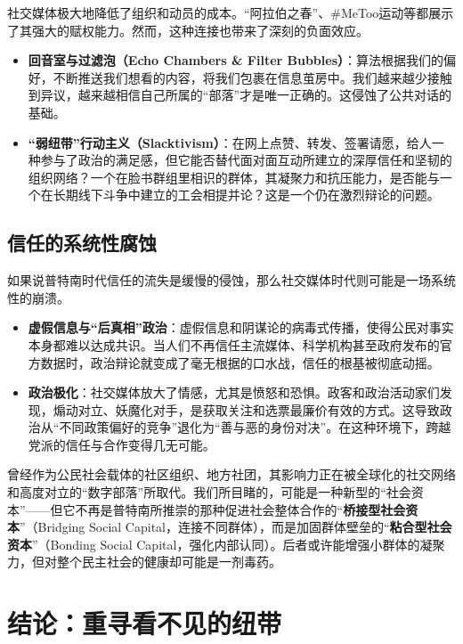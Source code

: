 \documentclass[a5paper, 11pt, openany]{ctexbook}
\begin{document}
社交媒体极大地降低了组织和动员的成本。“阿拉伯之春”、\#MeToo运动等都展示了其强大的赋权能力。然而，这种连接也带来了深刻的负面效应。
\begin{itemize}
    \item \textbf{回音室与过滤泡（Echo Chambers \& Filter Bubbles）}：算法根据我们的偏好，不断推送我们想看的内容，将我们包裹在信息茧房中。我们越来越少接触到异议，越来越相信自己所属的“部落”才是唯一正确的。这侵蚀了公共对话的基础。
    \item \textbf{“弱纽带”行动主义（Slacktivism）}：在网上点赞、转发、签署请愿，给人一种参与了政治的满足感，但它能否替代面对面互动所建立的深厚信任和坚韧的组织网络？一个在脸书群组里相识的群体，其凝聚力和抗压能力，是否能与一个在长期线下斗争中建立的工会相提并论？这是一个仍在激烈辩论的问题。
\end{itemize}

\subsection{信任的系统性腐蚀}

如果说普特南时代信任的流失是缓慢的侵蚀，那么社交媒体时代则可能是一场系统性的崩溃。
\begin{itemize}
    \item \textbf{虚假信息与“后真相”政治}：虚假信息和阴谋论的病毒式传播，使得公民对事实本身都难以达成共识。当人们不再信任主流媒体、科学机构甚至政府发布的官方数据时，政治辩论就变成了毫无根据的口水战，信任的根基被彻底动摇。
    \item \textbf{政治极化}：社交媒体放大了情感，尤其是愤怒和恐惧。政客和政治活动家们发现，煽动对立、妖魔化对手，是获取关注和选票最廉价有效的方式。这导致政治从“不同政策偏好的竞争”退化为“善与恶的身份对决”。在这种环境下，跨越党派的信任与合作变得几无可能。
\end{itemize}

曾经作为公民社会载体的社区组织、地方社团，其影响力正在被全球化的社交网络和高度对立的“数字部落”所取代。我们所目睹的，可能是一种新型的“社会资本”——但它不再是普特南所推崇的那种促进社会整体合作的“\textbf{桥接型社会资本}”（Bridging Social Capital，连接不同群体），而是加固群体壁垒的“\textbf{粘合型社会资本}”（Bonding Social Capital，强化内部认同）。后者或许能增强小群体的凝聚力，但对整个民主社会的健康却可能是一剂毒药。

\section*{结论：重寻看不见的纽带}
\end{document}
